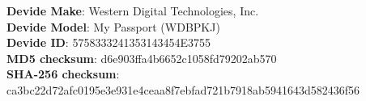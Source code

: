 \textbf{Devide Make}: Western Digital Technologies, Inc.\\
\textbf{Devide Model}: My Passport (WDBPKJ)\\
\textbf{Devide ID}: 5758333241353143454E3755\\
\textbf{MD5 checksum}: d6e903ffa4b6652c1058fd79202ab570\\
\textbf{SHA-256 checksum}: ca3bc22d72afc0195e3e931e4ceaa8f7ebfad721b7918ab5941643d582436f56